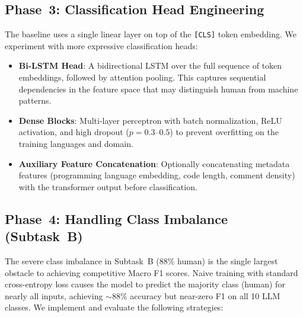 \documentclass[11pt]{article}
\begin{document}
\subsection{Phase~3: Classification Head Engineering}

The baseline uses a single linear layer on top of the \texttt{[CLS]} token embedding. We experiment with more expressive classification heads:

\begin{itemize}
    \item \textbf{Bi-LSTM Head}: A bidirectional LSTM over the full sequence of token embeddings, followed by attention pooling. This captures sequential dependencies in the feature space that may distinguish human from machine patterns.
    \item \textbf{Dense Blocks}: Multi-layer perceptron with batch normalization, ReLU activation, and high dropout ($p=0.3$--$0.5$) to prevent overfitting on the training languages and domain.
    \item \textbf{Auxiliary Feature Concatenation}: Optionally concatenating metadata features (programming language embedding, code length, comment density) with the transformer output before classification.
\end{itemize}

\subsection{Phase~4: Handling Class Imbalance (Subtask~B)}
\label{sec:imbalance}

The severe class imbalance in Subtask~B (88\% human) is the single largest obstacle to achieving competitive Macro F1 scores. Naive training with standard cross-entropy loss causes the model to predict the majority class (human) for nearly all inputs, achieving $\sim$88\% accuracy but near-zero F1 on all 10 LLM classes. We implement and evaluate the following strategies:
\end{document}
